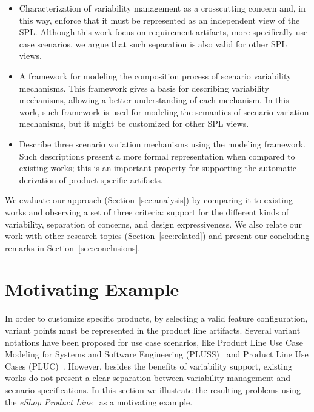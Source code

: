 \documentclass{llncs}
\begin{document}
\begin{itemize}

\item Characterization of variability management as a crosscutting concern and, in this way, enforce that it  
must be represented as an independent view of the SPL. Although this work focus on requirement artifacts, 
more specifically use case scenarios, we argue that such separation is also valid for other SPL views.
  
\item A framework for modeling the composition process of scenario variability mechanisms. 
This framework gives a basis for describing variability mechanisms, 
allowing a better understanding of each mechanism. In this work, such framework is used for modeling 
the semantics of scenario variation mechanisms, but it might be customized for other SPL views.

\item Describe three scenario variation mechanisms using the
modeling framework. Such descriptions present
a more formal representation when compared to existing works; this is an
important property for supporting the automatic derivation of product
specific artifacts.
\end{itemize}

We evaluate our approach (Section~\ref{sec:analysis}) by comparing it 
to existing works and observing a set of three criteria: support for the 
different kinds of variability, separation of concerns, and design expressiveness.  We 
also relate our work with other research topics (Section~\ref{sec:related}) and present our concluding 
remarks in Section~\ref{sec:conclusions}.

\section{Motivating Example}
\label{sec:example}

In order to customize specific products, by selecting a valid feature configuration, variant points must be represented in the 
product line artifacts. Several variant notations have been proposed for use case scenarios, like Product Line Use Case Modeling for Systems and 
Software Engineering (PLUSS)~\cite{eriksson-splc-2005} and Product Line Use Cases (PLUC)~\cite{bertolino-esec-2003}. However, besides
the benefits of variability support, existing works do not present a clear separation between variability 
management and scenario specifications. In this section we illustrate the resulting problems using the \emph{eShop Product Line}~\cite{eshop-url} 
as a motivating example. 
\end{document}
